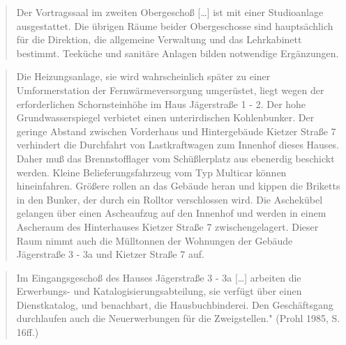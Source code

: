 \documentclass[a4paper,
fontsize=11pt,
oneside,
numbers=noperiodatend,
parskip=half-,
bibliography=totoc,
final
]{scrartcl}
\begin{document}
\begin{quote}
Der Vortragssaal im zweiten Obergeschoß {[}\ldots{}{]} ist mit einer
Studioanlage ausgestattet. Die übrigen Räume beider Obergeschosse sind
hauptsächlich für die Direktion, die allgemeine Verwaltung und das
Lehrkabinett bestimmt. Teeküche und sanitäre Anlagen bilden notwendige
Ergänzungen.
\end{quote}

\begin{quote}
Die Heizungsanlage, sie wird wahrscheinlich später zu einer
Umformerstation der Fernwärmeversorgung umgerüstet, liegt wegen der
erforderlichen Schornsteinhöhe im Haus Jägerstraße 1 - 2. Der hohe
Grundwasserspiegel verbietet einen unterirdischen Kohlenbunker. Der
geringe Abstand zwischen Vorderhaus und Hintergebäude Kietzer Straße 7
verhindert die Durchfahrt von Lastkraftwagen zum Innenhof dieses Hauses.
Daher muß das Brennstofflager vom Schüßlerplatz aus ebenerdig beschickt
werden. Kleine Belieferungsfahrzeug vom Typ Multicar können
hineinfahren. Größere rollen an das Gebäude heran und kippen die
Briketts in den Bunker, der durch ein Rolltor verschlossen wird. Die
Aschekübel gelangen über einen Ascheaufzug auf den Innenhof und werden
in einem Ascheraum des Hinterhauses Kietzer Straße 7 zwischengelagert.
Dieser Raum nimmt auch die Mülltonnen der Wohnungen der Gebäude
Jägerstraße 3 - 3a und Kietzer Straße 7 auf.
\end{quote}

\begin{quote}
Im Eingangsgeschoß des Hauses Jägerstraße 3 - 3a {[}\ldots{}{]} arbeiten
die Erwerbungs- und Katalogisierungsabteilung, sie verfügt über einen
Dienstkatalog, und benachbart, die Hausbuchbinderei. Den Geschäftsgang
durchlaufen auch die Neuerwerbungen für die Zweigstellen." (Prohl 1985,
S. 16ff.)
\end{quote}
\end{document}
